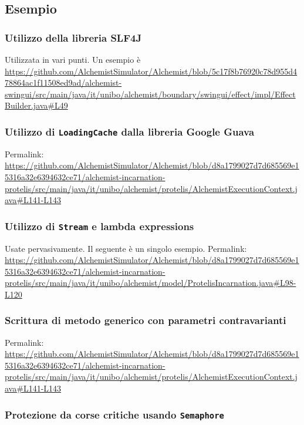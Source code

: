 \documentclass[a4paper,12pt]{report}
\begin{document}
\subsection{Esempio}

\subsubsection{Utilizzo della libreria SLF4J}

Utilizzata in vari punti.
Un esempio è \url{https://github.com/AlchemistSimulator/Alchemist/blob/5c17f8b76920c78d955d478864ac1f11508ed9ad/alchemist-swingui/src/main/java/it/unibo/alchemist/boundary/swingui/effect/impl/EffectBuilder.java#L49}

\subsubsection{Utilizzo di \texttt{LoadingCache} dalla libreria Google Guava}

Permalink: \url{https://github.com/AlchemistSimulator/Alchemist/blob/d8a1799027d7d685569e15316a32e6394632ce71/alchemist-incarnation-protelis/src/main/java/it/unibo/alchemist/protelis/AlchemistExecutionContext.java#L141-L143}

\subsubsection{Utilizzo di \texttt{Stream} e lambda expressions}

Usate pervasivamente. Il seguente è un singolo esempio.
Permalink: \url{https://github.com/AlchemistSimulator/Alchemist/blob/d8a1799027d7d685569e15316a32e6394632ce71/alchemist-incarnation-protelis/src/main/java/it/unibo/alchemist/model/ProtelisIncarnation.java#L98-L120}

\subsubsection{Scrittura di metodo generico con parametri contravarianti}

Permalink: \url{https://github.com/AlchemistSimulator/Alchemist/blob/d8a1799027d7d685569e15316a32e6394632ce71/alchemist-incarnation-protelis/src/main/java/it/unibo/alchemist/protelis/AlchemistExecutionContext.java#L141-L143}

\subsubsection{Protezione da corse critiche usando \texttt{Semaphore}}
\end{document}
